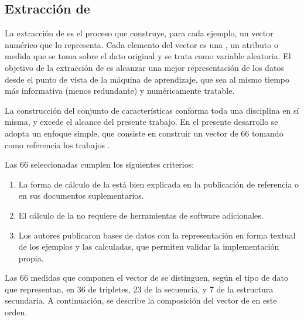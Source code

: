 %
%
\subsection{Extracción de }
%
La extracción de  es el proceso que construye, para cada
ejemplo, un vector numérico que lo representa.
Cada elemento del vector es una \e{\caract{}}, un atributo o medida
que se toma sobre el dato original y se trata como variable aleatoria.
El objetivo de la extracción de  es alcanzar una mejor
representación de los datos desde el punto de vista de la máquina de
aprendizaje, que sea al mismo tiempo más informativa (menos
redundante) y numéricamente tratable.

La construcción del conjunto de características conforma toda una
disciplina en sí misma, y excede el alcance del presente trabajo.
En el presente desarrollo se adopta un enfoque simple, que consiste en
construir un vector de 66  tomando como referencia los
trabajos \cite{xue,ng,batuwita}.

Las 66  seleccionadas cumplen los siguientes criterios:
%
\begin{enumerate}
\item
  La forma de cálculo de la \caract{} está bien explicada en la
  publicación de referencia o en sus documentos suplementarios.
\item
  El cálculo de la \caract{} no requiere de herramientas de software
  adicionales.
\item
  Los autores publicaron bases de datos con la representación en forma
  textual de los ejemplos y las  calculadas, que permiten
  validar la implementación propia.
\end{enumerate}
%

Las 66 medidas que componen el vector de  se distinguen,
según el tipo de dato que representan, en 36  de tripletes,
23  de la secuencia, y 7 de la estructura secundaria.
A continuación, se describe la composición del vector de 
en este orden.

